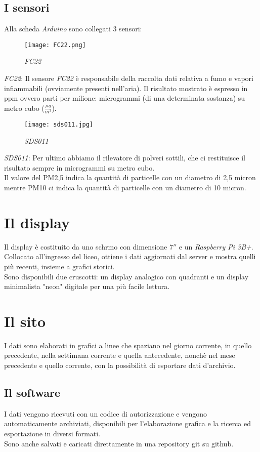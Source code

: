 \documentclass{article}
\begin{document}
\subsection{I sensori}
Alla scheda \emph{Arduino} sono collegati 3 sensori:
\begin{figure}[h!]
\centering
\texttt{[image: FC22.png]}\\
\caption{\emph{FC22}}
\end{figure}
\emph{FC22}: Il sensore \emph{FC22} è responsabile della raccolta dati relativa a fumo e vapori infiammabili (ovviamente presenti nell’aria). Il risultato mostrato è espresso in ppm ovvero parti per milione: microgrammi (di una determinata sostanza) su metro cubo ($\frac{\mu g}{m^3}$).
\begin{figure}[h!]
\centering
\texttt{[image: sds011.jpg]}\\
\caption{\emph{SDS011}}
\end{figure}
\emph{SDS011}: Per ultimo abbiamo il rilevatore di polveri sottili, che ci restituisce il risultato sempre in microgrammi su metro cubo.\\
Il valore del PM2,5 indica la quantità di particelle con un diametro di 2,5 micron mentre PM10 ci indica la quantità di particelle con un diametro di 10 micron.
\section{Il display}
Il display è costituito da uno schrmo con dimensione $7''$ e un \emph{Raspberry Pi 3B+}.
Collocato all'ingresso del liceo, ottiene i dati aggiornati dal server e mostra quelli più recenti, insieme a grafici storici.\\
Sono disponibili due cruscotti: un display analogico con quadranti e un display minimalista "neon" digitale per una più facile lettura.
\section{Il sito}
I dati sono elaborati in grafici a linee che spaziano nel giorno corrente, in quello precedente, nella settimana corrente e quella antecedente, nonchè nel mese precedente e quello corrente, con la possibilità di esportare dati d'archivio.\\
\subsection{Il software}
I dati vengono ricevuti con un codice di autorizzazione e vengono automaticamente archiviati, disponibili per l'elaborazione grafica e la ricerca ed esportazione in diversi formati.\\
Sono anche salvati e caricati direttamente in una repository git su github.
\end{document}

